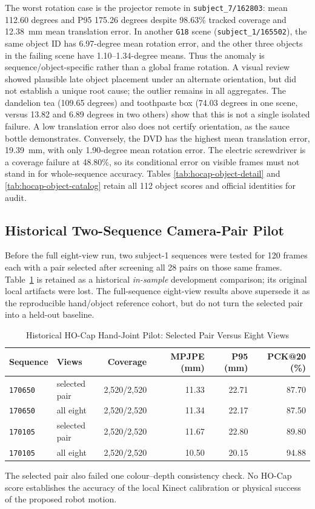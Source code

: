 The worst rotation case is the projector remote in
\texttt{subject\_7/162803}: mean 112.60 degrees and P95 175.26 degrees
despite 98.63\% tracked coverage and 12.38~mm mean translation error.
In another \texttt{G18} scene (\texttt{subject\_1/165502}), the same
object ID has 6.97-degree mean rotation error, and the other three
objects in the failing scene have 1.10--1.34-degree means. Thus the
anomaly is sequence/object-specific rather than a global frame rotation.
A visual review showed plausible late object placement under an alternate
orientation, but did not establish a unique root cause; the outlier remains
in all aggregates. The dandelion tea (109.65 degrees) and toothpaste box
(74.03 degrees in one scene, versus 13.82 and 6.89 degrees in two others)
show that this is not a single isolated failure. A low translation error
also does not certify orientation, as the sauce bottle demonstrates.
Conversely, the DVD has the highest mean translation error, 19.39~mm,
with only 1.90-degree mean rotation error. The electric screwdriver is a
coverage failure at 48.80\%, so its conditional error on visible frames
must not stand in for whole-sequence accuracy. Tables
\ref{tab:hocap-object-detail} and \ref{tab:hocap-object-catalog} retain
all 112 object scores and official identities for audit.

\subsection{Historical Two-Sequence Camera-Pair Pilot}

Before the full eight-view run, two subject-1 sequences were tested for
120 frames each with a pair selected after screening all 28 pairs on those
same frames. Table~\ref{tab:hocap-hand} is retained as a historical
\emph{in-sample} development comparison; its original local artifacts
were lost. The full-sequence eight-view results above supersede it as the
reproducible hand/object reference cohort, but do not turn the selected
pair into a held-out baseline.

\begin{table}[htbp]
\caption{Historical HO-Cap Hand-Joint Pilot: Selected Pair Versus Eight Views}
\label{tab:hocap-hand}
\centering\small
\begin{tabular}{llrrrr}
\toprule
Sequence & Views & Coverage & MPJPE (mm) & P95 (mm) & PCK@20 (\%) \\
\midrule
\texttt{170650} & selected pair & 2,520/2,520 & 11.33 & 22.71 & 87.70 \\
\texttt{170650} & all eight & 2,520/2,520 & 11.34 & 22.17 & 87.50 \\
\texttt{170105} & selected pair & 2,520/2,520 & 11.67 & 22.80 & 89.80 \\
\texttt{170105} & all eight & 2,520/2,520 & 10.50 & 20.15 & 94.88 \\
\bottomrule
\end{tabular}
\end{table}

The selected pair also failed one colour--depth consistency check. No
HO-Cap score establishes the accuracy of the local Kinect calibration or
physical success of the proposed robot motion.

